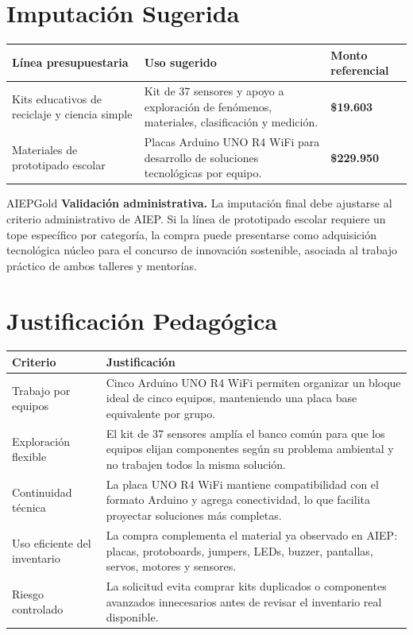 \documentclass[10pt,letterpaper]{article}
\newcommand{\money}[1]{\textbf{\$#1}}
\begin{document}
\section{Imputación Sugerida}

\begin{tabularx}{\textwidth}{L{4.3cm}Y L{3cm}}
\hline
\textbf{Línea presupuestaria} & \textbf{Uso sugerido} & \textbf{Monto referencial} \\
\hline
Kits educativos de reciclaje y ciencia simple & Kit de 37 sensores y apoyo a exploración de fenómenos, materiales, clasificación y medición. & \money{19.603} \\
\hline
Materiales de prototipado escolar & Placas Arduino UNO R4 WiFi para desarrollo de soluciones tecnológicas por equipo. & \money{229.950} \\
\hline
\end{tabularx}

\begin{infobox}{AIEPGold}
\textbf{Validación administrativa.}
La imputación final debe ajustarse al criterio administrativo de AIEP. Si la línea de prototipado escolar requiere un tope específico por categoría, la compra puede presentarse como adquisición tecnológica núcleo para el concurso de innovación sostenible, asociada al trabajo práctico de ambos talleres y mentorías.
\end{infobox}

\section{Justificación Pedagógica}

\begin{tabularx}{\textwidth}{L{4.1cm}Y}
\hline
\textbf{Criterio} & \textbf{Justificación} \\
\hline
Trabajo por equipos & Cinco Arduino UNO R4 WiFi permiten organizar un bloque ideal de cinco equipos, manteniendo una placa base equivalente por grupo. \\
\hline
Exploración flexible & El kit de 37 sensores amplía el banco común para que los equipos elijan componentes según su problema ambiental y no trabajen todos la misma solución. \\
\hline
Continuidad técnica & La placa UNO R4 WiFi mantiene compatibilidad con el formato Arduino y agrega conectividad, lo que facilita proyectar soluciones más completas. \\
\hline
Uso eficiente del inventario & La compra complementa el material ya observado en AIEP: placas, protoboards, jumpers, LEDs, buzzer, pantallas, servos, motores y sensores. \\
\hline
Riesgo controlado & La solicitud evita comprar kits duplicados o componentes avanzados innecesarios antes de revisar el inventario real disponible. \\
\hline
\end{tabularx}
\end{document}

